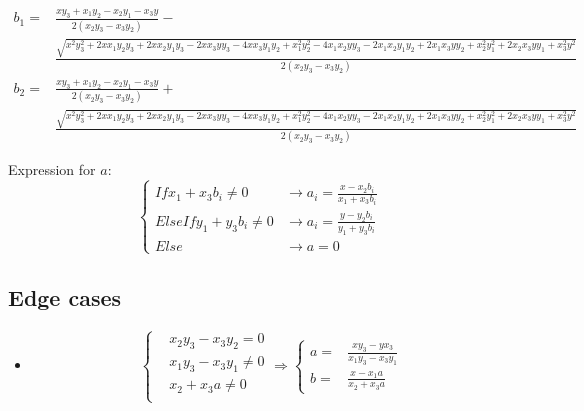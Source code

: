\documentclass{article}
\begin{document}
\begin{landscape}
    \begin{equation}
        \begin{aligned}
            b_1 = & \frac{x y_{3} + x_{1} y_{2} - x_{2} y_{1} - x_{3} y}{2 \left(x_{2} y_{3} - x_{3} y_{2}\right)} - \\
                  & \frac{\sqrt{x^{2} y_{3}^{2} + 2 x x_{1} y_{2} y_{3} + 2 x x_{2} y_{1} y_{3} - 2 x x_{3} y y_{3} - 4 x x_{3} y_{1} y_{2} + x_{1}^{2} y_{2}^{2} - 4 x_{1} x_{2} y y_{3} - 2 x_{1} x_{2} y_{1} y_{2} + 2 x_{1} x_{3} y y_{2} + x_{2}^{2} y_{1}^{2} + 2 x_{2} x_{3} y y_{1} + x_{3}^{2} y^{2}}}{2 \left(x_{2} y_{3} - x_{3} y_{2}\right)} \\
            b_2 = & \frac{x y_{3} + x_{1} y_{2} - x_{2} y_{1} - x_{3} y}{2 \left(x_{2} y_{3} - x_{3} y_{2}\right)} + \\ 
                  & \frac{\sqrt{x^{2} y_{3}^{2} + 2 x x_{1} y_{2} y_{3} + 2 x x_{2} y_{1} y_{3} - 2 x x_{3} y y_{3} - 4 x x_{3} y_{1} y_{2} + x_{1}^{2} y_{2}^{2} - 4 x_{1} x_{2} y y_{3} - 2 x_{1} x_{2} y_{1} y_{2} + 2 x_{1} x_{3} y y_{2} + x_{2}^{2} y_{1}^{2} + 2 x_{2} x_{3} y y_{1} + x_{3}^{2} y^{2}}}{2 \left(x_{2} y_{3} - x_{3} y_{2}\right)}
        \end{aligned}
    \end{equation}

    Expression for $a$:
    \begin{equation}
        \left\{
        \begin{aligned}
            If x_1+x_3b_i \neq 0 & \rightarrow a_i = \frac{x - x_2 b_i}{x_1+x_3b_i} \\
            Else If y_1+y_3b_i \neq 0 & \rightarrow a_i = \frac{y - y_2 b_i}{y_1+y_3b_i}\\
            Else & \rightarrow a = 0
        \end{aligned}
        \right.
    \end{equation}


    \subsection*{Edge cases}

    \begin{itemize}
        \item 
    
        \begin{equation}
            \left\{
            \begin{aligned}
                & x_2 y_3 - x_3 y_2 = 0 \\
                & x_1 y_3 - x_3 y_1 \neq 0 \\
                & x_2 + x_3 a \neq 0 \\
            \end{aligned}
            \right.
            \Rightarrow
            \left\{
            \begin{aligned}
                a = & \frac{x y_3 - y x_3}{x_1 y_3 - x_3 y_1}\\
                b = & \frac{x - x_1 a}{x_2 + x_3 a}     
            \end{aligned}
            \right.
        \end{equation}


\end{itemize}
\end{landscape}
\end{document}
